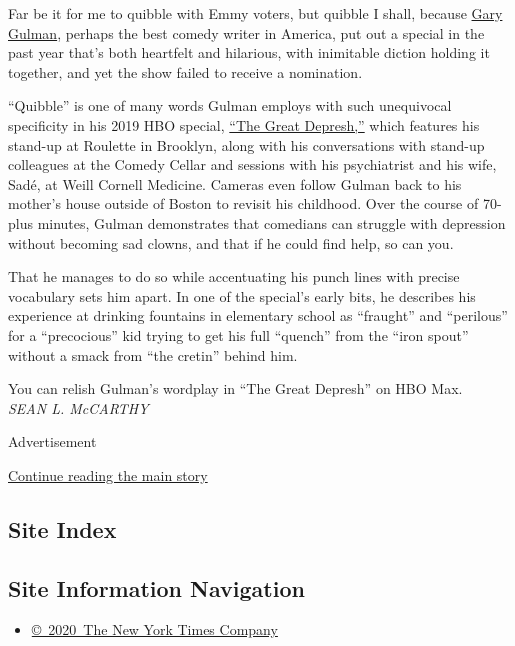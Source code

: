 Far be it for me to quibble with Emmy voters, but quibble I shall,
because \href{https://garygulman.com/}{Gary Gulman}, perhaps the best
comedy writer in America, put out a special in the past year that's both
heartfelt and hilarious, with inimitable diction holding it together,
and yet the show failed to receive a nomination.

``Quibble'' is one of many words Gulman employs with such unequivocal
specificity in his 2019 HBO special,
\href{https://www.hbo.com/specials/gary-gulman-the-great-depresh}{``The
Great Depresh,''} which features his stand-up at Roulette in Brooklyn,
along with his conversations with stand-up colleagues at the Comedy
Cellar and sessions with his psychiatrist and his wife, Sadé, at Weill
Cornell Medicine. Cameras even follow Gulman back to his mother's house
outside of Boston to revisit his childhood. Over the course of 70-plus
minutes, Gulman demonstrates that comedians can struggle with depression
without becoming sad clowns, and that if he could find help, so can you.

That he manages to do so while accentuating his punch lines with precise
vocabulary sets him apart. In one of the special's early bits, he
describes his experience at drinking fountains in elementary school as
``fraught'' and ``perilous'' for a ``precocious'' kid trying to get his
full ``quench'' from the ``iron spout'' without a smack from ``the
cretin'' behind him.

You can relish Gulman's wordplay in ``The Great Depresh'' on HBO Max.\\
\emph{SEAN L. McCARTHY}

Advertisement

\protect\hyperlink{after-bottom}{Continue reading the main story}

\hypertarget{site-index}{%
\subsection{Site Index}\label{site-index}}

\hypertarget{site-information-navigation}{%
\subsection{Site Information
Navigation}\label{site-information-navigation}}

\begin{itemize}
\tightlist
\item
  \href{https://help.nytimes.com/hc/en-us/articles/115014792127-Copyright-notice}{©~2020~The
  New York Times Company}
\end{itemize}

